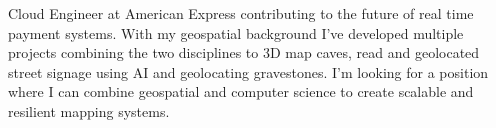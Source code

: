 

\begin{cvparagraph}

Cloud Engineer at American Express contributing to the future of real time payment systems. With my geospatial background I've developed multiple projects combining the two disciplines to 3D map caves, read and geolocated street signage using AI and geolocating gravestones.
I'm looking for a position where I can combine geospatial and computer science to create scalable and resilient mapping systems.
\end{cvparagraph}
